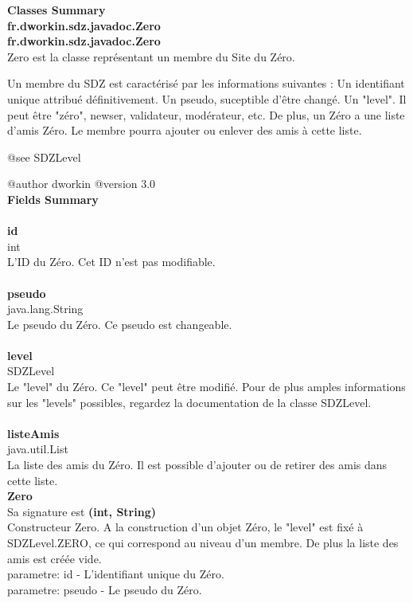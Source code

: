 \documentclass[10pt]{article}
\begin{document}
\noindent
\huge{\textbf{Classes Summary}}\\
\LARGE{\textbf{fr.dworkin.sdz.javadoc.Zero}}\\
\newpage
\LARGE{\textbf{fr.dworkin.sdz.javadoc.Zero}}\\
 Zero est la classe représentant un membre du Site du Zéro.
 
 Un membre du SDZ est caractérisé par les informations suivantes :
 Un identifiant unique attribué définitivement.
 Un pseudo, suceptible d'être changé.
 Un "level". Il peut être "zéro", newser, validateur, modérateur, etc.
 De plus, un Zéro a une liste d'amis Zéro. Le membre pourra ajouter ou enlever
 des amis à cette liste.
 
 @see SDZLevel
 
 @author dworkin
 @version 3.0
\\
\noindent
\huge{\textbf{Fields Summary}}\\
\\\textbf{id}\\
int\\
L'ID du Zéro. Cet ID n'est pas modifiable.\\
\\\textbf{pseudo}\\
java.lang.String\\
Le pseudo du Zéro. Ce pseudo est changeable.\\
\\\textbf{level}\\
SDZLevel\\
Le "level" du Zéro. Ce "level" peut être modifié.
 Pour de plus amples informations sur les "levels" possibles, regardez la
 documentation de la classe SDZLevel.\\
\\\textbf{listeAmis}\\
java.util.List\\
La liste des amis du Zéro.
 Il est possible d'ajouter ou de retirer des amis dans cette liste.\\
\textbf{Zero}\\
Sa signature est \textbf{(int, String)}\\
Constructeur Zero.
 A la construction d'un objet Zéro, le "level" est fixé à SDZLevel.ZERO, ce qui
 correspond au niveau d'un membre. De plus la liste des amis est créée vide.\\
parametre: id - L'identifiant unique du Zéro.\\
parametre: pseudo - Le pseudo du Zéro.\\
\end{document}
